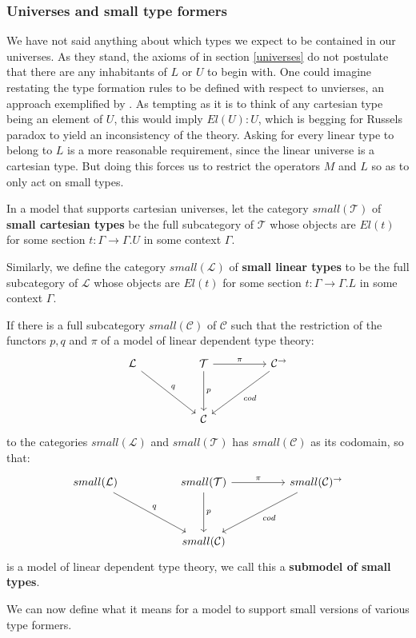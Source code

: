 \subsubsection{Universes and small type formers}\label{universesML}
We have not said anything about which types we expect to be contained in our universes. As they stand, the axioms of in section \ref{universes} do not postulate that there are any inhabitants of $L$ or $U$ to begin with. One could imagine restating the type formation rules to be defined with respect to unvierses, an approach exemplified by \cite{krishnaswami}. As tempting as it is to think of any cartesian type being an element of $U$, this would imply $El(U) : U$, which is begging for Russels paradox to yield an inconsistency of the theory. Asking for every linear type to belong to $L$ is a more reasonable requirement, since the linear universe is a cartesian type. But doing this forces us to restrict the operators $M$ and $L$ so as to only act on small types.
\begin{defn}In a model that supports cartesian universes, let the category $small(\mathcal{T})$ of \textbf{small cartesian types} be the full subcategory of $\mathcal{T}$ whose objects are $El(t)$ for some section $t : \Gamma \to \Gamma.U$ in some context $\Gamma$.
\end{defn}
\begin{defn}
  Similarly, we define the category $small(\mathcal{L})$ of \textbf{small linear types} to be the full subcategory of $\mathcal{L}$ whose objects are $El(t)$ for some section $t : \Gamma \to \Gamma.L$ in some context $\Gamma$.
\end{defn}
\begin{defn}
  If there is a full subcategory $small(\mathcal{C})$ of $\mathcal{C}$ such that the restriction of the functors $p, q$ and $\pi$ of a model of linear dependent type theory:
  \[
    \ti
    \mathcal{L} \ar[rd, "q"] & \mathcal{T}\ar[d, "p"] \ar[r, "\pi"] & \mathcal{C}^\to \ar[ld, "cod"]\\
    & \mathcal{C}
    \kz
  \]
  to the categories $small(\mathcal{L})$ and $small(\mathcal{T})$ has $small(\mathcal{C})$ as its codomain, so that:
    \[
    \ti
    small(\mathcal{L}) \ar[rd, "q"] & small(\mathcal{T})\ar[d, "p"] \ar[r, "\pi"] & small(\mathcal{C})^\to \ar[ld, "cod"]\\
    & small(\mathcal{C})
    \kz
  \]
  is a model of linear dependent type theory, we call this a \textbf{submodel of small types}.
\end{defn}
We can now define what it means for a model to support small versions of various type formers. 
